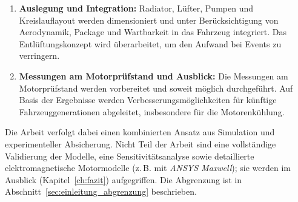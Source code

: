 \begin{enumerate}
    \item \textbf{Auslegung und Integration:} Radiator, Lüfter, Pumpen und Kreislauflayout werden dimensioniert und unter Berücksichtigung von Aerodynamik, Package und Wartbarkeit in das Fahrzeug integriert. Das Entlüftungskonzept wird überarbeitet, um den Aufwand bei Events zu verringern.

    \item \textbf{Messungen am Motorprüfstand und Ausblick:} Die Messungen am Motorprüfstand werden vorbereitet und soweit möglich durchgeführt. Auf Basis der Ergebnisse werden Verbesserungsmöglichkeiten für künftige Fahrzeuggenerationen abgeleitet, insbesondere für die Motorenkühlung.
\end{enumerate}

Die Arbeit verfolgt dabei einen kombinierten Ansatz aus Simulation und experimenteller Absicherung. Nicht Teil der Arbeit sind eine vollständige Validierung der Modelle, eine Sensitivitätsanalyse sowie detaillierte elektromagnetische Motormodelle (z.\,B. mit \textit{ANSYS Maxwell}); sie werden im Ausblick (Kapitel~\ref{ch:fazit}) aufgegriffen. Die Abgrenzung ist in Abschnitt~\ref{sec:einleitung_abgrenzung} beschrieben.